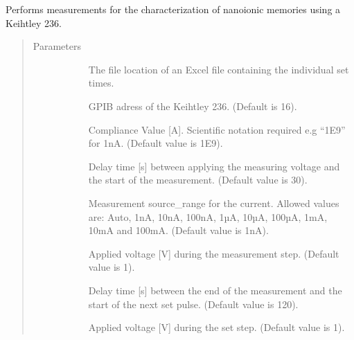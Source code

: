 \documentclass[letterpaper,10pt,english,openany,oneside]{sphinxmanual}
\begin{document}
\begin{fulllineitems}
\label{\detokenize{index:measurement.measurement}}
Performs measurements for the characterization of nanoionic memories using
a Keihtley 236.
\begin{quote}\begin{description}
\item[{Parameters}] \leavevmode\begin{description}
\item[{}] \leavevmode
The file location of an Excel file containing the individual set times.

\item[{}] \leavevmode
GPIB adress of the Keihtley 236. (Default is 16).

\item[{}] \leavevmode
Compliance Value {[}A{]}. Scientific notation required e.g “1E\sphinxhyphen{}9” for 1nA.
(Default value is 1E\sphinxhyphen{}9).

\item[{}] \leavevmode
Delay time {[}s{]} between applying the measuring voltage and the start of the measurement.
(Default value is 30).

\item[{}] \leavevmode
Measurement source\_range for the current. Allowed values are: Auto, 1nA, 10nA, 100nA,
1µA, 10µA, 100µA, 1mA, 10mA and 100mA. (Default value is 1nA).

\item[{}] \leavevmode
Applied voltage {[}V{]} during the measurement step. (Default value is 1).

\item[{}] \leavevmode
Delay time {[}s{]} between the end of the measurement and the start of the next set pulse.
(Default value is 120).

\item[{}] \leavevmode
Applied voltage {[}V{]} during the set step. (Default value is 1).

\end{description}

\end{description}\end{quote}

\end{fulllineitems}
\end{document}
